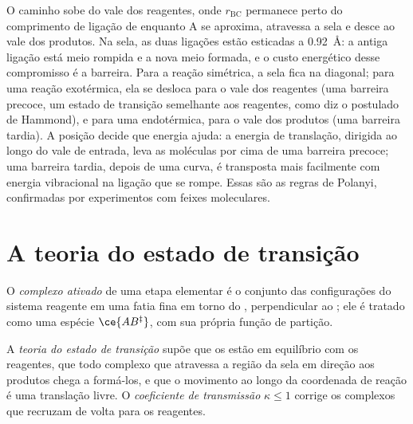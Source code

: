 O caminho sobe do vale dos reagentes, onde $r_{\mathrm{BC}}$ permanece perto do comprimento
de ligação de  enquanto A se aproxima, atravessa a sela e desce ao vale dos
produtos. Na sela, as duas ligações estão esticadas a \qty{0.92}{\angstrom}: a antiga
ligação está meio rompida e a nova meio formada, e o custo energético desse
compromisso é a barreira. Para a reação simétrica, a sela fica na diagonal; para
uma reação exotérmica, ela se desloca para o vale dos reagentes (uma barreira
precoce, um estado de transição semelhante aos reagentes, como diz o postulado de
Hammond), e para uma endotérmica, para o vale dos produtos (uma barreira tardia).
A posição decide que energia ajuda: a energia de translação, dirigida ao longo do
vale de entrada, leva as moléculas por cima de uma barreira precoce; uma barreira
tardia, depois de uma curva, é transposta mais facilmente com energia vibracional
na ligação que se rompe. Essas são as regras de Polanyi, confirmadas por
experimentos com feixes moleculares.

\section{A teoria do estado de transição}

\begin{definition}\label{def:b3:rate-theories:activated-complex}
O \emph{complexo ativado} de uma etapa elementar é o
conjunto das configurações do sistema reagente em uma fatia fina em torno do
, perpendicular ao ; ele é tratado como
uma espécie $\ce{AB^{\ddagger}}$, com sua própria função de partição.
\end{definition}

\begin{definition}\label{def:b3:rate-theories:tst}
A \emph{teoria do estado de transição} supõe que
os  estão em equilíbrio com os reagentes, que todo complexo que
atravessa a região da sela em direção aos produtos chega a formá-los, e que o
movimento ao longo da coordenada de reação é uma translação livre. O
\emph{coeficiente de transmissão} $\kappa \le 1$ corrige
os complexos que recruzam de volta para os reagentes.
\end{definition}

